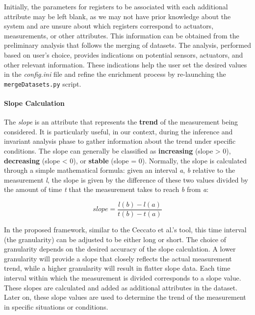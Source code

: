 Initially, the parameters for registers to be associated with each additional attribute may be left blank, as we may not have prior knowledge about the system and are unsure about which registers correspond to actuators, measurements, or other attributes. This information can be obtained from the preliminary analysis that follows the merging of datasets. The analysis, performed based on user's choice, provides indications on potential sensors, actuators, and other relevant information. These indications help the user set the desired values in the \textit{config.ini} file and refine the enrichment process by re-launching the \texttt{mergeDatasets.py} script.

\paragraph{Slope Calculation}
\label{par:4_slope_calculation}
The \textit{slope} is an attribute that represents the \textbf{trend} of the measurement being considered. It is particularly useful, in our context, during the inference and invariant analysis phase to gather information about the trend under specific conditions. The slope can generally be classified as \textbf{increasing} (slope > 0), \textbf{decreasing} (slope < 0), or \textbf{stable} (slope = 0).\newline
Normally, the slope is calculated through a simple mathematical formula: given an interval \textit{a}, \textit{b} relative to the measurement \textit{l}, the slope is given by the difference of these two values divided by the amount of time \textit{t} that the measurement takes to reach \textit{b} from \textit{a}:

\[slope = \frac{l(b) -l(a)}{t(b) - t(a)}\]

In the proposed framework, similar to the Ceccato et al.'s tool, this time interval (the granularity) can be adjusted to be either long or short. The choice of granularity depends on the desired accuracy of the slope calculation. A lower granularity will provide a slope that closely reflects the actual measurement trend, while a higher granularity will result in flatter slope data. Each time interval within which the measurement is divided corresponds to a slope value. These slopes are calculated and added as additional attributes in the dataset. Later on, these slope values are used to determine the trend of the measurement in specific situations or conditions.

